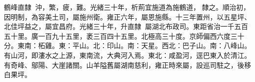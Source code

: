 \begin{pinyinscope}
鶴峰直隸：沖，繁，疲，難。光緒三十年，析荊宜施道為施鶴道，隸之。順治初，因明制，為容美土司，屬施州衛。雍正六年，屬恩施縣。十三年置州，以五星坪、北佳坪益之，屬宜昌府。光緒三十年，升直隸，屬湖北布政司。東距省治一千五百五十里。廣一百九十五里，袤三百四十五里。北極高三十度。京師偏西六度三十分。東南：柘雞。東：平山。北：印山。南：天星。西北：巴子山。南：八峰山。有山河，即漊水之上源，東南流，大典河入焉。東北：咸盈河，逕巴東入於清江。有奇峰、鄔陽、大崖諸關。山羊隘舊屬湖南慈利，雍正時來屬，設巡司駐之，後移白果坪。


\end{pinyinscope}